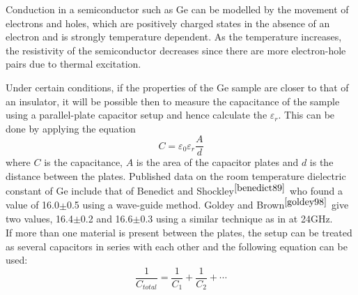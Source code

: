 \documentclass[a4paper,11pt]{article}
\begin{document}
Conduction in a semiconductor such as Ge can be modelled by the movement of electrons and holes, which are positively charged states in the absence of an electron and is strongly temperature dependent. As the temperature increases, the resistivity of the semiconductor decreases since there are more electron-hole pairs due to thermal excitation. 

Under certain conditions, if the properties of the Ge sample are closer to that of an insulator, it will be possible then to measure the capacitance of the sample using a parallel-plate capacitor setup and hence calculate the $\varepsilon_{r}$. This can be done by applying the equation 
\begin{equation}
	\label{e:capacitor}
 	C = \varepsilon_{0}\varepsilon_{r}\frac{A}{d}
\end{equation}
where $C$ is the capacitance, $A$ is the area of the capacitor plates and $d$ is the distance between the plates. Published data on the room temperature dielectric constant of Ge include that of Benedict and Shockley$^{\cite{benedict89}}$ who found a value of 16.0$\pm$0.5 using a wave-guide method. Goldey and Brown$^{\cite{goldey98}}$ give two values, 16.4$\pm$0.2 and 16.6$\pm$0.3 using a similar technique as in \cite{benedict89} at 24GHz.
\\
If more than one material is present between the plates, the setup can be treated as several capacitors in series with each other and the following equation can be used:
\begin{equation}
 	\label{e:series}
	\frac{1}{C_{total}} = \frac{1}{C_{1}} + \frac{1}{C_{2}} + \cdots
\end{equation}


\end{document}
